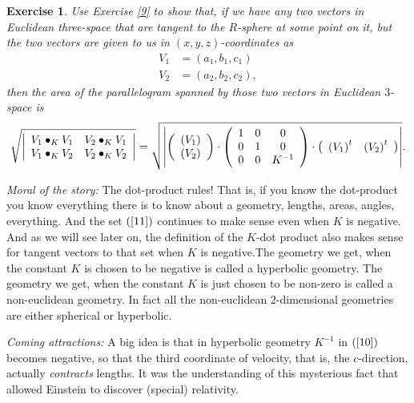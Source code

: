 \documentclass{article}%
\newtheorem{exercise}[theorem]{Exercise}
\begin{document}
\begin{exercise}
\label{222}Use Exercise \ref{9} to show that, if we have any two vectors in
Euclidean three-space that are tangent to the $R$-sphere at some point on it,
but the two vectors are given to us in $\left(  x,y,z\right)  $-coordinates as%
\begin{align*}
V_{1}  &  =\left(  a_{1},b_{1},c_{1}\right) \\
V_{2}  &  =\left(  a_{2},b_{2},c_{2}\right)  ,
\end{align*}
then the area of the parallelogram spanned by those two vectors in Euclidean
$3$-space is%
\[
\sqrt{\left\vert
\begin{array}
[c]{cc}%
V_{1}\bullet_{K}V_{1} & V_{2}\bullet_{K}V_{1}\\
V_{1}\bullet_{K}V_{2} & V_{2}\bullet_{K}V_{2}%
\end{array}
\right\vert }=\sqrt{\left\vert \left(
\begin{array}
[c]{c}%
\left(  V_{1}\right) \\
\left(  V_{2}\right)
\end{array}
\right)  \cdot\left(
\begin{array}
[c]{ccc}%
1 & 0 & 0\\
0 & 1 & 0\\
0 & 0 & K^{-1}%
\end{array}
\right)  \cdot\left(
\begin{array}
[c]{cc}%
\left(  V_{1}\right)  ^{t} & \left(  V_{2}\right)  ^{t}%
\end{array}
\right)  \right\vert }.
\]

\end{exercise}

\textit{Moral of the story:} The dot-product rules! That is, if you know the
dot-product you know everything there is to know about a geometry, lengths,
areas, angles, everything. And the set $\left(  \ref{11}\right)  $ continues
to make sense even when $K$ is negative. And as we will see later on, the
definition of the $K$-dot product also makes sense for tangent vectors to that
set when $K$ is negative.The geometry we get, when the constant $K$ is chosen
to be negative is called a hyperbolic geometry. The geometry we get, when the
constant $K$ is just chosen to be non-zero is called a non-euclidean geometry.
In fact all the non-euclidean $2$-dimensional geometries are either spherical
or hyperbolic.

\textit{Coming attractions:} A big idea is that in hyperbolic geometry
$K^{-1}$ in $\left(  \ref{10}\right)  $ becomes negative, so that the third
coordinate of velocity, that is, the $c$-direction, actually
\textit{contracts} lengths. It was the understanding of this mysterious fact
that allowed Einstein to discover (special) relativity.\pagebreak
\end{document}
